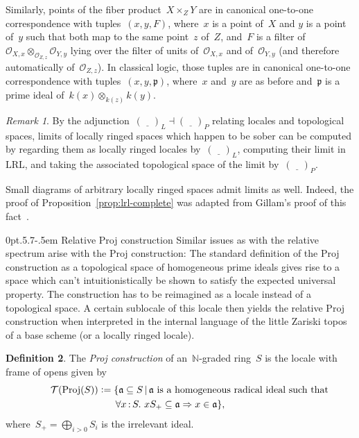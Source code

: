 \documentclass[10pt,reqno,a4paper]{amsbook}
\makeatletter
\theoremstyle{definition}
\newtheorem{defn}{Definition}[section]
\theoremstyle{plain}
\theoremstyle{remark}
\newtheorem{rem}[defn]{Remark}
\renewcommand{\O}{\mathcal{O}}
\newcommand{\T}{\mathcal{T}}
\newcommand{\NN}{\mathbb{N}}
\newcommand{\aaa}{\mathfrak{a}}
\newcommand{\ppp}{\mathfrak{p}}
\newcommand{\placeholder}{\underline{\quad}}
\newcommand{\LRL}{\mathrm{LRL}}
\DeclareMathOperator{\Proj}{Proj}
\newcommand{\Open}{\T}
\newcommand{\?}{\,{:}\,}
\renewcommand{\_}{\mathpunct{.}\,}
\newcommand{\defeq}{\vcentcolon=}
\def\subsection{\@startsection{subsection}{2}%
  {0pt}{.5\linespacing\@plus.7\linespacing}{-.5em}%
  {\normalfont\bfseries}}
\makeatother
\begin{document}
Similarly, points of the fiber product~$X \times_Z Y$ are in canonical
one-to-one correspondence with tuples~$(x,y,F)$, where~$x$ is a point of~$X$
and $y$ is a point of~$y$ such that both map to the same point~$z$ of~$Z$,
and~$F$ is a filter of~$\O_{X,x} \otimes_{\O_{Z,z}} \O_{Y,y}$ lying over the
filter of units of~$\O_{X,x}$ and of~$\O_{Y,y}$ (and therefore automatically
of~$\O_{Z,z}$). In classical logic, those tuples are in canonical one-to-one
correspondence with tuples~$(x,y,\ppp)$, where~$x$ and~$y$ are as before
and~$\ppp$ is a prime ideal of~$k(x) \otimes_{k(z)} k(y)$.

\begin{rem}By the adjunction~$(\placeholder)_L \dashv (\placeholder)_P$
relating locales and topological spaces, limits of locally ringed spaces which
happen to be sober can be computed by regarding them as locally ringed
locales by~$(\placeholder)_L$, computing their limit in~$\LRL$, and taking
the associated topological space of the limit by~$(\placeholder)_P$.

Small diagrams of arbitrary locally ringed spaces admit limits as well.
Indeed, the proof of Proposition~\ref{prop:lrl-complete} was adapted from
Gillam's proof of this fact~\cite[Corollary~5]{gillam:localization}.\end{rem}


\subsection{Relative Proj construction} Similar issues as with the relative
spectrum arise with the Proj construction: The standard definition of the Proj
construction as a topological space of homogeneous prime ideals gives rise to a
space which can't intuitionistically be shown to satisfy the expected
universal property. The construction has to be reimagined as a locale
instead of a topological space. A certain sublocale of this locale then yields
the relative Proj construction when interpreted in the internal language of
the little Zariski topos of a base scheme (or a locally ringed locale).

\begin{defn}The \emph{Proj construction} of an~$\NN$-graded ring~$S$ is the
locale with frame of opens given by
\begin{multline*}
  \qquad\Open(\Proj(S)) \defeq
    \{ \aaa \subseteq S \,|\,
      \text{$\aaa$ is a homogeneous radical ideal such that} \\
  \forall x\?S\_
    x S_+ \subseteq \aaa \Rightarrow x \in \aaa \},\qquad
\end{multline*}
where~$S_+ = \bigoplus_{i > 0} S_i$ is the irrelevant ideal.
\end{defn}
\end{document}
